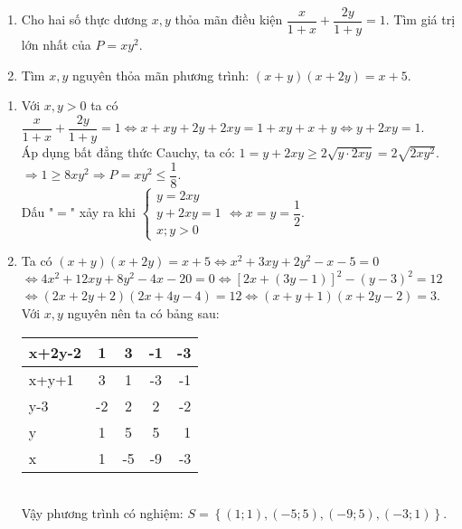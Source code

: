 \begin{ex}%
    \begin{enumerate}
        \item Cho hai số thực dương $x, y$ thỏa mãn điều kiện $\dfrac{x}{1+x} +\dfrac{2y}{1+y} =1$. Tìm giá trị lớn nhất của $P=xy^2$.
        \item Tìm $x, y$ nguyên thỏa mãn phương trình: $(x+y)(x+2y)= x+5$.
    \end{enumerate}
\loigiai
    {
    \begin{enumerate}
    	\item Với $x, y>0$ ta có $\dfrac{x}{1+x} +\dfrac{2y}{1+y} =1 \Leftrightarrow  x+xy+2y+2xy=1+xy+x+y \Leftrightarrow y+2xy=1$.\\
    	Áp dụng bất đẳng thức Cauchy, ta có: $1=y+2xy \geq 2\sqrt{y \cdot 2xy}= 2\sqrt{2xy^2}$.\\
    	$\Rightarrow 1\geq 8xy^2 \Rightarrow P=xy^2 \leq \dfrac{1}{8}$.\\
    	 Dấu "$=$" xảy ra khi $\begin{cases} y=2xy \\ y+2xy=1\\ x;y>0 \end{cases} \Leftrightarrow x=y= \dfrac{1}{2}$.
    	\item Ta có $(x+y)(x+2y)= x+5 \Leftrightarrow x^2+3xy+2y^2-x-5=0 $\\ $\Leftrightarrow 4x^2+12xy+8y^2-4x-20=0 \Leftrightarrow [2x+(3y-1)]^2 - (y-3)^2= 12$\\
    	$ \Leftrightarrow (2x+2y+2)(2x+4y-4)=12 \Leftrightarrow (x+y+1)(x+2y-2)= 3$.\\
    	Với $x, y$ nguyên nên ta có bảng sau:\\
    	\begin{tabular}{|l|c|c|c|r|}
    		\hline 
    		x+2y-2 & 1 & 3 & -1 & -3\\ 
    		\hline 
    		x+y+1 & 3 & 1 & -3 & -1\\ 
    		\hline 
    		y-3 & -2 & 2 & 2 & -2\\
    		\hline
    		y & 1 & 5 & 5 & 1\\
    		\hline
    		x & 1 & -5 & -9 & -3\\
    		\hline
    	\end{tabular}\\
    Vậy phương trình có nghiệm: $S= \left\{(1; 1), (-5; 5), (-9; 5), (-3; 1)\right\}$.
    \end{enumerate}
    }
\end{ex}

